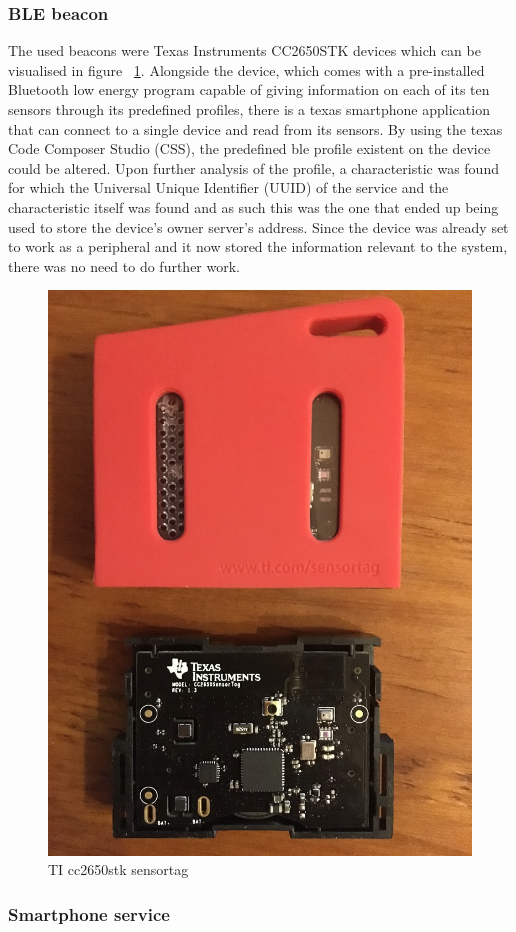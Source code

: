\documentclass[a4paper]{IEEEtran}
\begin{document}
\subsubsection{ BLE beacon} 
\label{subsec:beacon} 
 
 
The used beacons were Texas Instruments CC2650STK devices which can be visualised in figure ~\ref{fig:beacon}. Alongside the device, which comes with a pre-installed Bluetooth low energy program capable of giving information on each of its ten sensors through its predefined profiles, there is a texas smartphone application that can connect to a single device and read from its sensors. By using the texas Code Composer Studio (CSS), the predefined ble profile existent on the device could be altered. Upon further analysis of the profile, a characteristic was found for which the Universal Unique Identifier (UUID) of the service and the characteristic itself was found and as such this was the one that ended up being used to store the device's owner server's address. Since the device was already set to work as a peripheral and it now stored the information relevant to the system, there was no need to do further work. 
 
 
\begin{figure} 
\centering 
\includegraphics[width=0.5\linewidth]{figures/beacon.jpg} 
\caption[TI cc2650stk sensortag]{TI cc2650stk sensortag} 
\label{fig:beacon} 
\end{figure} 
 
 
\subsubsection{ Smartphone service} 
\label{subsec:service} 
 
\end{document}
